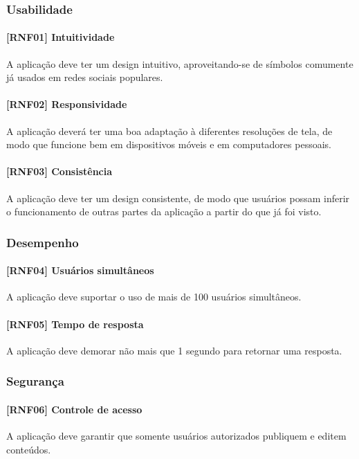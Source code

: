 \subsubsection{Usabilidade}

\paragraph{[RNF01] Intuitividade}
A aplicação deve ter um design intuitivo, aproveitando-se de símbolos comumente já usados em redes sociais populares.

\paragraph{[RNF02] Responsividade}
A aplicação deverá ter uma boa adaptação à diferentes resoluções de tela, de modo que funcione bem em dispositivos móveis e em computadores pessoais.

\paragraph{[RNF03] Consistência}
A aplicação deve ter um design consistente, de modo que usuários possam inferir o funcionamento de outras partes da aplicação a partir do que já foi visto.


\subsubsection{Desempenho}

\paragraph{[RNF04] Usuários simultâneos}
A aplicação deve suportar o uso de mais de 100 usuários simultâneos.

\paragraph{[RNF05] Tempo de resposta}
A aplicação deve demorar não mais que 1 segundo para retornar uma resposta.


\subsubsection{Segurança}

\paragraph{[RNF06] Controle de acesso}
A aplicação deve garantir que somente usuários autorizados publiquem e editem conteúdos.

